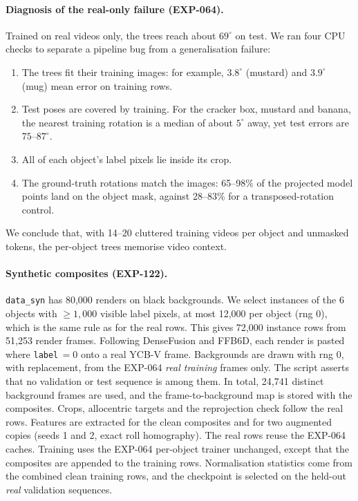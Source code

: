 \paragraph{Diagnosis of the real-only failure (EXP-064).}
Trained on real videos only, the trees reach about $69^\circ$ on test. We ran four CPU checks to separate a pipeline bug from a generalisation failure:
\begin{enumerate}
  \item The trees fit their training images: for example, $3.8^\circ$ (mustard) and $3.9^\circ$ (mug) mean error on training rows.
  \item Test poses are covered by training. For the cracker box, mustard and banana, the nearest training rotation is a median of about $5^\circ$ away, yet test errors are $75$--$87^\circ$.
  \item All of each object's label pixels lie inside its crop.
  \item The ground-truth rotations match the images: 65--98\% of the projected model points land on the object mask, against 28--83\% for a transposed-rotation control.
\end{enumerate}
We conclude that, with 14--20 cluttered training videos per object and unmasked tokens, the per-object trees memorise video context.

\paragraph{Synthetic composites (EXP-122).}
\texttt{data\_syn} has 80{,}000 renders on black backgrounds. We select instances of the 6 objects with $\ge1{,}000$ visible label pixels, at most 12{,}000 per object (rng 0), which is the same rule as for the real rows. This gives 72{,}000 instance rows from 51{,}253 render frames. Following DenseFusion and FFB6D, each render is pasted where \texttt{label}$\,=0$ onto a real YCB-V frame.
Backgrounds are drawn with rng 0, with replacement, from the EXP-064 \emph{real training} frames only. The script asserts that no validation or test sequence is among them. In total, 24{,}741 distinct background frames are used, and the frame-to-background map is stored with the composites.
Crops, allocentric targets and the reprojection check follow the real rows. Features are extracted for the clean composites and for two augmented copies (seeds 1 and 2, exact roll homography). The real rows reuse the EXP-064 caches.
Training uses the EXP-064 per-object trainer unchanged, except that the composites are appended to the training rows. Normalisation statistics come from the combined clean training rows, and the checkpoint is selected on the held-out \emph{real} validation sequences.

